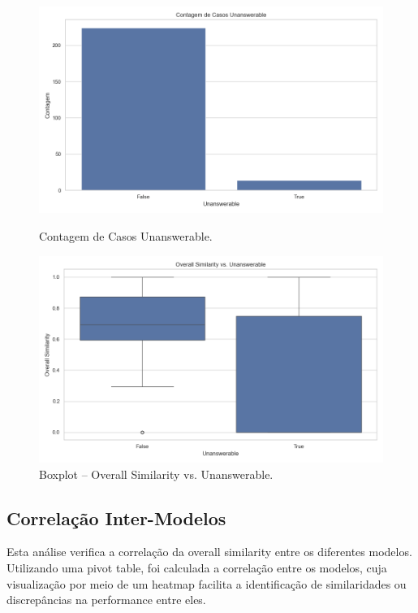 \documentclass{article}%
\begin{document}
\begin{figure}[H]%
\begin{minipage}[b]{0.45\textwidth}%
\centering%
\includegraphics[width=\linewidth]{analysis_results/count_unanswerable.png}%
\caption*{Contagem de Casos Unanswerable.}%
\end{minipage}\hfill%
\begin{minipage}[b]{0.45\textwidth}%
\centering%
\includegraphics[width=\linewidth]{analysis_results/boxplot_overall_vs_unanswerable.png}%
\caption*{Boxplot – Overall Similarity vs. Unanswerable.}%
\end{minipage}%
\end{figure}

%
\subsection*{Correlação Inter{-}Modelos}%
\label{subsec:CorrelaoInter{-}Modelos}%
Esta análise verifica a correlação da overall similarity entre os diferentes modelos. Utilizando uma pivot table, foi calculada a correlação entre os modelos, cuja visualização por meio de um heatmap facilita a identificação de similaridades ou discrepâncias na performance entre eles.%
\end{document}
